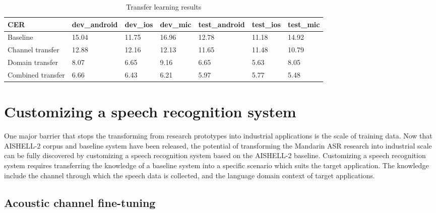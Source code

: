 \documentclass[a4paper]{article}
\begin{document}
\begin{table}[th]
  \caption{Transfer learning results}
  \label{tab:trans}
  \centering
  \begin{tabular}{ lllllll }
    \toprule
    CER               &  dev\_android           &  dev\_ios           &  dev\_mic           &  test\_android           &  test\_ios           &  test\_mic     \\
    \midrule
    Baseline          &  15.04                 &  11.75             &  16.96             &  12.78                  &  11.18              &  14.92        \\
    Channel transfer  &  12.88                 &  12.16             &  12.13             &  11.65                  &  11.48              &  10.79        \\
    Domain transfer   &  8.07                  &  6.65              &  9.16              &  6.65                   &  5.63               &  8.05         \\
    Combined transfer &  6.66                  &  6.43              &  6.21              &  5.97                   &  5.77               &  5.48         \\
    \bottomrule
  \end{tabular}
\end{table}

\section{Customizing a speech recognition system}

One major barrier that stops the transforming from research prototypes into
industrial applications is the scale of training data. Now that AISHELL-2 corpus
and baseline system have been released, the potential of transforming the
Mandarin ASR research into industrial scale can be fully discovered by
customizing a speech recognition system based on the AISHELL-2
baseline. Customizing a speech recognition system requires transferring the
knowledge of a baseline system into a specific scenario which suits the target
application. The knowledge include the channel through which the speech data is
collected, and the language domain context of target applications.

\subsection{Acoustic channel fine-tuning}
\end{document}

